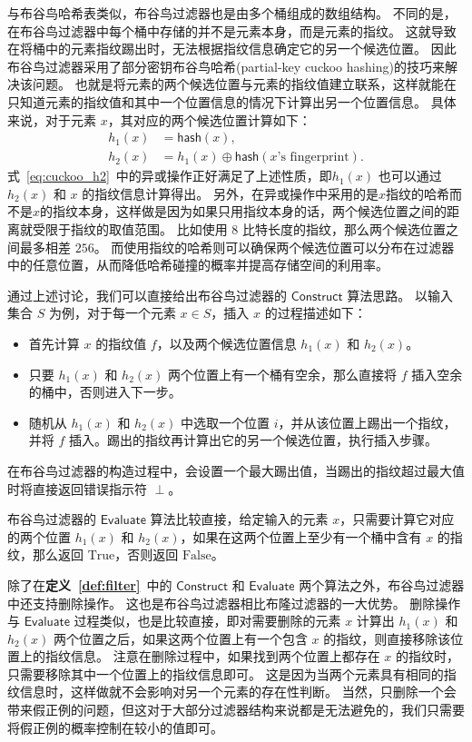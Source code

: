与布谷鸟哈希表类似，布谷鸟过滤器也是由多个桶组成的数组结构。
不同的是，在布谷鸟过滤器中每个桶中存储的并不是元素本身，而是元素的指纹。
这就导致在将桶中的元素指纹踢出时，无法根据指纹信息确定它的另一个候选位置。
因此布谷鸟过滤器采用了部分密钥布谷鸟哈希(partial-key cuckoo hashing)的技巧来解决该问题。
也就是将元素的两个候选位置与元素的指纹值建立联系，这样就能在只知道元素的指纹值和其中一个位置信息的情况下计算出另一个位置信息。
具体来说，对于元素 $x$，其对应的两个候选位置计算如下：
\begin{align}
  h_1(x) & = \mathsf{hash}(x), \\
  h_2(x) & = h_1(x) \oplus \mathsf{hash}(x\mbox{'s fingerprint}). \label{eq:cuckoo_h2}
\end{align}
式~\ref{eq:cuckoo_h2}~中的异或操作正好满足了上述性质，即$h_1(x)$ 也可以通过 $h_2(x)$ 和 $x$ 的指纹信息计算得出。
另外，在异或操作中采用的是$x$指纹的哈希而不是$x$的指纹本身，这样做是因为如果只用指纹本身的话，两个候选位置之间的距离就受限于指纹的取值范围。
比如使用 $8$ 比特长度的指纹，那么两个候选位置之间最多相差 $256$。
而使用指纹的哈希则可以确保两个候选位置可以分布在过滤器中的任意位置，从而降低哈希碰撞的概率并提高存储空间的利用率。

通过上述讨论，我们可以直接给出布谷鸟过滤器的 $\mathsf{Construct}$ 算法思路。
以输入集合 $S$ 为例，对于每一个元素 $x\in S$，插入 $x$ 的过程描述如下：
\begin{itemize}
  \item 首先计算 $x$ 的指纹值 $f$，以及两个候选位置信息 $h_1(x)$ 和 $h_2(x)$。
  \item 只要 $h_1(x)$ 和 $h_2(x)$ 两个位置上有一个桶有空余，那么直接将 $f$ 插入空余的桶中，否则进入下一步。
  \item 随机从 $h_1(x)$ 和 $h_2(x)$ 中选取一个位置 $i$，并从该位置上踢出一个指纹，并将 $f$ 插入。踢出的指纹再计算出它的另一个候选位置，执行插入步骤。
\end{itemize}
在布谷鸟过滤器的构造过程中，会设置一个最大踢出值，当踢出的指纹超过最大值时将直接返回错误指示符 $\perp$。

布谷鸟过滤器的 $\mathsf{Evaluate}$ 算法比较直接，给定输入的元素 $x$，只需要计算它对应的两个位置 $h_1(x)$ 和 $h_2(x)$，如果在这两个位置上至少有一个桶中含有 $x$ 的指纹，那么返回 $\mbox{True}$，否则返回 $\mbox{False}$。

除了在\textbf{定义~\ref{def:filter}}~中的 $\mathsf{Construct}$ 和 $\mathsf{Evaluate}$ 两个算法之外，布谷鸟过滤器中还支持删除操作。
这也是布谷鸟过滤器相比布隆过滤器的一大优势。
删除操作与 $\mathsf{Evaluate}$ 过程类似，也是比较直接，即对需要删除的元素 $x$ 计算出 $h_1(x)$ 和 $h_2(x)$ 两个位置之后，如果这两个位置上有一个包含 $x$ 的指纹，则直接移除该位置上的指纹信息。
注意在删除过程中，如果找到两个位置上都存在 $x$ 的指纹时，只需要移除其中一个位置上的指纹信息即可。
这是因为当两个元素具有相同的指纹信息时，这样做就不会影响对另一个元素的存在性判断。
当然，只删除一个会带来假正例的问题，但这对于大部分过滤器结构来说都是无法避免的，我们只需要将假正例的概率控制在较小的值即可。

